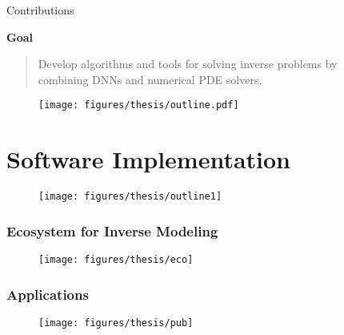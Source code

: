 \documentclass[usenames,dvipsnames]{beamer}
\begin{document}
\begin{frame}{Contributions}
	
	\textbf{Goal}
	
	\vspace{0.2cm}
	
	\begin{quote}
	Develop algorithms and tools for solving inverse problems by \\ combining DNNs and numerical PDE solvers. 
	\end{quote}

	
	\begin{figure}[hbt]
	\centering
	\texttt{[image: figures/thesis/outline.pdf]}
\end{figure}
\end{frame}



\section{Software Implementation}

\begin{frame}	
	
	\begin{figure}[hbt]
		\centering
		\texttt{[image: figures/thesis/outline1]}
	\end{figure}
\end{frame}


\begin{frame}
	\frametitle{Ecosystem for Inverse Modeling}
	
	
	\begin{figure}[hbt]
		\centering
		\texttt{[image: figures/thesis/eco]}
	\end{figure}
\end{frame}

\begin{frame}
	\frametitle{Applications}
	
	
	\begin{figure}[hbt]
		\centering
		\texttt{[image: figures/thesis/pub]}
	\end{figure}
\end{frame}
\end{document}

